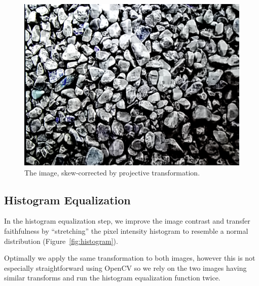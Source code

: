 \documentclass[11pt, letterpaper]{article}
\begin{document}
\begin{figure}[hbtp]
\centering
\includegraphics[scale=0.2]{img/skew2.png}
\caption{The image, skew-corrected by projective transformation.}
\label{fig:skew2}
\end{figure}

\subsection{Histogram Equalization}
In the histogram equalization step, we improve the image contrast and transfer faithfulness by ``stretching'' the pixel intensity histogram to resemble a normal distribution (Figure~\ref{fig:histogram}).

Optimally we apply the same transformation to both images, however this is not especially straightforward using OpenCV so we rely on the two images having similar transforms and run the histogram equalization function twice.
\end{document}
